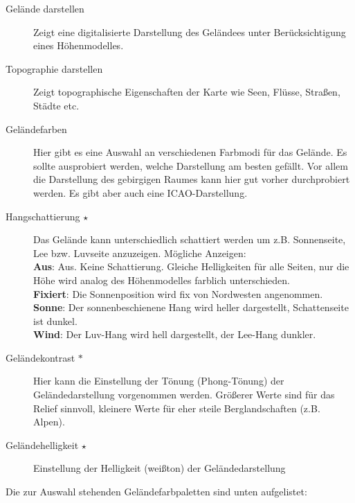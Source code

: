 \begin{description}
\item[Gelände darstellen]  Zeigt eine digitalisierte Darstellung des Geländees unter Berücksichtigung eines Höhenmodelles.
\item[Topographie darstellen]  Zeigt topographische Eigenschaften der Karte wie Seen, Flüsse, Straßen, Städte etc.\
\item[Geländefarben]  Hier gibt es eine Auswahl an verschiedenen Farbmodi für das Gelände. Es sollte ausprobiert werden,
welche Darstellung am besten gefällt. Vor allem die Darstellung des gebirgigen Raumes kann hier gut vorher durchprobiert werden.
Es gibt aber auch eine ICAO-Darstellung.
\item[Hangschattierung $\star$]  \label{conf:shading} Das Gelände kann unterschiedlich schattiert werden
um z.B. Sonnenseite, Lee bzw. Luvseite anzuzeigen. Mögliche Anzeigen:\\
{\bf Aus}: Aus. Keine Schattierung. Gleiche  Helligkeiten für alle Seiten, nur die Höhe wird analog des
Höhenmodelles farblich unterschieden.\\
{\bf Fixiert}: Die Sonnenposition wird fix von Nordwesten angenommen.\\
{\bf Sonne}: Der sonnenbeschienene  Hang wird heller dargestellt, Schattenseite ist dunkel.\\
{\bf Wind}: Der Luv-Hang wird hell dargestellt, der Lee-Hang dunkler.\\ 
\item[Geländekontrast $\ast$]  Hier kann die Einstellung der Tönung (Phong-Tönung) der Geländedarstellung
vorgenommen werden.
Größerer Werte sind für das Relief sinnvoll, kleinere Werte für eher
steile Berglandschaften (z.B. Alpen).
\item[Geländehelligkeit $\star$]  Einstellung der Helligkeit (weißton) der Geländedarstellung
\end{description}

Die zur Auswahl stehenden Geländefarbpaletten sind unten aufgelistet:

